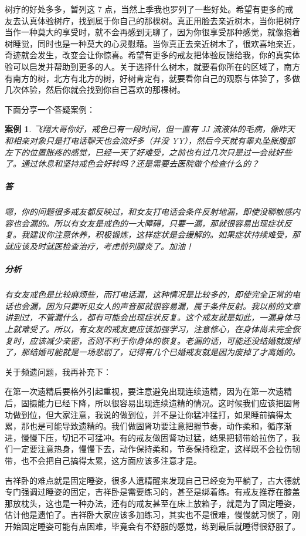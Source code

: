 \documentclass[fontset=founder]{ctexart}
\newtheorem{case}{案例}
\begin{document}
树疗的好处多多，暂列这 7 点，当然上季我也罗列了一些好处。希望有更多的戒友去认真体验树疗，找到属于你自己的那棵树。真正用脸去亲近树木，当你把树疗当作一种莫大的享受时，就不会再感到无聊了，因为你很享受那种感觉，就像抱着树睡觉，同时也是一种莫大的心灵慰藉。当你真正去亲近树木了，很欢喜地亲近，奇迹就会发生，改变会让你惊喜。希望有更多的戒友把体验反馈给我，你的真实体验可以启发并帮助到更多的人。关于选择什么树木，就要看你所在的区域了，南方有南方的树，北方有北方的树，好树肯定有，就要看你自己的观察与体验了，多做几次体验，然后你就会找到你自己喜欢的那棵树。

下面分享一个答疑案例：

\begin{case}
    飞翔大哥你好，戒色已有一段时间，但一直有 JJ 流液体的毛病，像昨天和相亲对象只是打电话聊天也会流好多（并没 YY），然后今天就有睾丸坠胀腹部左下的位置胀疼的感觉，已经一天了好难受，之前也有过几次只是过一会就好些了。通过休息和坚持戒色会好转吗？还是需要去医院做个检查什么的？

    \subparagraph{答} 嗯，你的问题很多戒友都反映过，和女友打电话会条件反射地漏，即使没聊敏感内容也会漏的。所以有女友是戒色的一大障碍，只要一漏，那就很容易出现症状反复。我建议你注意休养，积极锻炼，这样症状是会缓解的。如果症状持续难受，那就应该及时就医检查治疗，考虑前列腺炎了。加油！

    \subparagraph{分析} 有女友戒色是比较麻烦些，而打电话漏，这种情况是比较多的，即使完全正常的电话也会漏，因为只要听见女人的声音那就很容易漏，属于条件反射。我以前的文章讲到过，不管漏什么，都有可能会出现症状反复。这个戒友就是如此，一漏身体马上就难受了。所以，有女友的戒友更应该加强学习，注意修心，在身体尚未完全恢复时，应该减少亲密，否则不利于你身体的恢复。老漏的话，可能还没结婚就废掉了，那结婚可能就是一场悲剧了，记得有几个已婚戒友就是因为废掉了才离婚的。
\end{case}

关于频遗问题，我再补充下：

在第一次遗精后要格外引起重视，要注意避免出现连续遗精，因为在第一次遗精后，固摄能力已经下降，所以很容易出现连续遗精的情况。这时候我们应该把固肾功做到位，但大家注意，我说的做到位，并不是让你猛冲猛打，如果睡前搞得太累，那也是可能导致遗精的。我们做固肾功要注意把握节奏，动作柔和，循序渐进，慢慢下压，切记不可猛冲。有的戒友做固肾功过猛，结果把韧带给拉伤了，我们一定要注意热身，慢慢下去，动作保持柔和，节奏保持稳定，这样既不会拉伤韧带，也不会把自己搞得太累，这方面应该多注意才是。

吉祥卧的难点就是固定睡姿，很多人遗精醒来发现自己已经变为平躺了，古大德就专门强调过睡姿的固定，吉祥卧是需要练习的，甚至是绑着练。有戒友推荐在膝盖那放枕头，这也是一种办法，还有的戒友甚至在床上放箱子，就是为了固定睡姿，估计他是遗怕了。吉祥卧大家应该多加练习，其实也不是很难，慢慢就习惯了，刚开始固定睡姿可能有点困难，毕竟会有不舒服的感觉，练到最后就睡得很舒服了。
\end{document}
